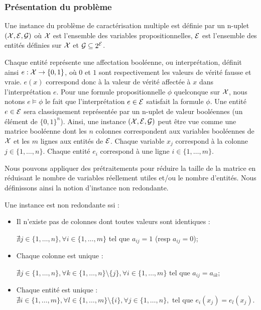 \subsubsection{Présentation du problème}

\begin{definition}
Une instance du problème de caractérisation multiple est définie par un n-uplet
$({\cal X}, {\cal E}, {\cal G})$ où $\cal X$ est l'ensemble des
variables propositionnelles, ${\cal E}$ est l'ensemble des entités définies sur
$\cal X$ et ${\cal G} \subseteq 2^{\cal E}$.
\end{definition}

Chaque entité représente une affectation booléenne, ou interprétation, définit ainsi  $e : {\cal X} \to \{0,1\}$, où  $0$ et $1$ sont respectivement les valeurs de vérité fausse et vraie. $e(x)$ correspond donc à la valeur de vérité affectée à $x$ dans l'interprétation $e$. Pour une formule propositionnelle  $\phi$ quelconque sur ${\cal X}$, nous notons $e \models \phi $ le fait que l'interprétation $e \in {\cal E}$ satisfait la formule $\phi$. Une entité $e \in {\cal E}$ sera classiquement représentée par un n-uplet de valeur booléennes (un élément de  $ \{0,1\}^n$).   Ainsi, une instance $({\cal X}, {\cal E}, {\cal G})$  peut être vue comme une matrice booléenne dont les $n$ colonnes correspondent aux variables booléennes de ${\cal X}$ et les $m$ lignes aux entités de ${\cal E}$.  Chaque variable $x_j$ correspond à la colonne $j \in \{1, \ldots, n \} $. Chaque entité $e_i$ correspond à une ligne $i \in \{1, \ldots, m \}$.

Nous pouvons appliquer des prétraitements pour réduire la taille de la matrice en réduisant le nombre de variables réellement utiles et/ou le nombre d'entités. Nous définissons ainsi la notion d'instance non redondante.

\begin{definition}
Une instance est non redondante ssi :
\begin{itemize}
\item Il n'existe pas de colonnes dont toutes valeurs sont identiques :

$\nexists j \in \{1,\ldots, n \},\forall i \in \{1, \ldots, m \} $ tel que $a_{ij}=1$ (resp $a_{ij}=0$);
\item Chaque colonne est unique :

$\nexists j \in \{1, \ldots, n \},\forall k \in \{1, \ldots, n \} \setminus \{j\}, \forall i \in \{1, \ldots, m \} $ tel que $a_{ij}=a_{ik}$;
\item Chaque entité est unique : \\$ \nexists i \in \{1, \ldots, m \},
\forall l \in \{1, \ldots, m \} \setminus \{i\},\forall j \in \{1, \ldots, n \},$ tel que $e_i(x_j)=e_l(x_j)$.
\end{itemize}
\end{definition}

